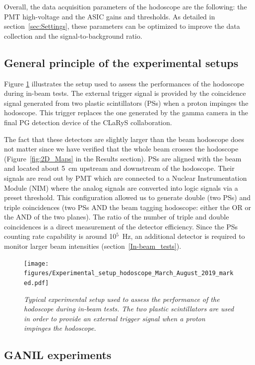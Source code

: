 \documentclass[a4paper,11pt]{article}
\begin{document}
Overall, the data acquisition parameters of the hodoscope are the following: the PMT high-voltage and the ASIC gains and thresholds. As detailed in section~\ref{sec:Settings}, these parameters can be optimized to improve the data collection and the signal-to-background ratio.


\subsection{General principle of the experimental setups}
\label{GeneralPrinc}

Figure \ref{fig:Picture_Setup_hodo} illustrates the setup used to assess the performances of the hodoscope during in-beam tests. The external trigger signal is provided by the coincidence signal generated from two plastic scintillators (PSs) when a proton impinges the hodoscope. This trigger replaces the one generated by the gamma camera in the final PG detection device of the CLaRyS collaboration.

The fact that these detectors are slightly larger than the beam hodoscope does not matter since we have verified that the whole beam crosses the hodoscope (Figure~\ref{fig:2D_Maps} in the Results section). PSs are aligned with the beam and located about 5~cm upstream and downstream of the hodoscope. Their signals are read out by PMT which are connected to a Nuclear Instrumentation Module (NIM) where the analog signals are converted into logic signals via a preset threshold. This configuration allowed us to generate double (two PSs) and triple coincidences (two PSs AND the beam tagging hodoscope: either the OR or the AND of the two planes). The ratio of the number of triple and double coincidences is a direct measurement of the detector efficiency. Since the PSs counting rate capability is around {10}$^{5}$~Hz, an additional detector is required to monitor larger beam intensities (section~\ref{In-beam_tests}).

\begin{figure}[htb]
\centering
\texttt{[image: figures/Experimental\_setup\_hodoscope\_March\_August\_2019\_marked.pdf]}
\caption{\small{\textit{Typical experimental setup used to assess the performance of the hodoscope during in-beam tests. The two plastic scintillators are used in order to provide an external trigger signal when a proton impinges the hodoscope.}}}
\label{fig:Picture_Setup_hodo}
\end{figure}


\subsection{GANIL experiments}
\end{document}

